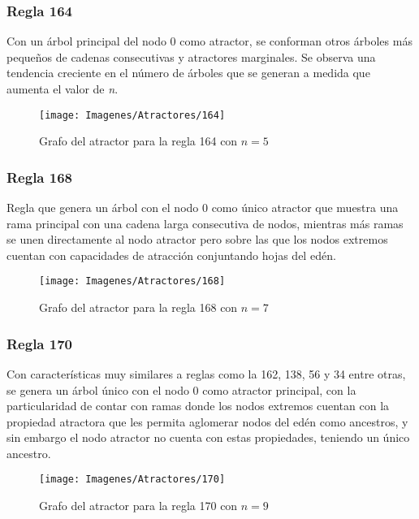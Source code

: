 \documentclass[]{article}
\begin{document}
			\newpage
			\subsubsection{Regla 164}
				\justifying	
				Con un árbol principal del nodo 0 como atractor, se conforman otros árboles más pequeños de cadenas consecutivas y atractores marginales. Se observa una tendencia creciente en el número de árboles que se generan a medida que aumenta el valor de \textit{n}.
				
				\hfill\break
				\hfill\break
				\begin{figure}[!h]
					\centering
					\texttt{[image: Imagenes/Atractores/164]}
					\caption{Grafo del atractor para la regla 164 con $n=5$}
					\label{Regla_164}
				\end{figure}
				
			\newpage
			\subsubsection{Regla 168}
				\justifying
				Regla que genera un árbol con el nodo 0 como único atractor que muestra una rama principal con una cadena larga consecutiva de nodos, mientras más ramas se unen directamente al nodo atractor pero sobre las que los nodos extremos cuentan con capacidades de atracción conjuntando hojas del edén.
				
				\hfill\break
				\hfill\break
				\begin{figure}[!h]
					\centering
					\texttt{[image: Imagenes/Atractores/168]}
					\caption{Grafo del atractor para la regla 168 con $n=7$}
					\label{Regla_168}
				\end{figure}
			
			\newpage
			\subsubsection{Regla 170}
				\justifying
				Con características muy similares a reglas como la 162, 138, 56 y 34 entre otras, se genera un árbol único con el nodo 0 como atractor principal, con la particularidad de contar con ramas donde los nodos extremos cuentan con la propiedad atractora que les permita aglomerar nodos del edén como ancestros, y sin embargo el nodo atractor no cuenta con estas propiedades, teniendo un único ancestro.
				
				\hfill\break
				\hfill\break
				\begin{figure}[!h]
					\centering
					\texttt{[image: Imagenes/Atractores/170]}
					\caption{Grafo del atractor para la regla 170 con $n=9$}
					\label{Regla_170}
				\end{figure}
			
\end{document}
